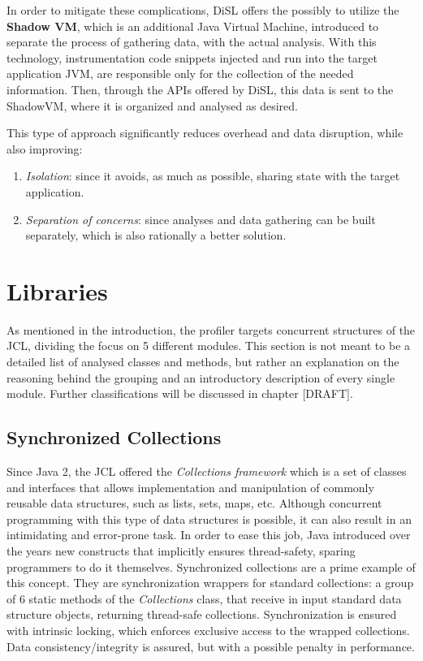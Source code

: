 \documentclass[]{usiinfthesis}
\begin{document}
In order to mitigate these complications, DiSL offers the possibly to utilize the \textbf{Shadow VM}, which is an additional Java Virtual Machine, introduced to separate the process of gathering data, with the actual analysis. With this technology, instrumentation code snippets injected and run into the target application JVM, are responsible only for the collection of the needed information. Then, through the APIs offered by DiSL, this data is sent to the ShadowVM, where it is organized and analysed as desired. 

This type of approach significantly reduces overhead and data disruption, while also improving:
\begin{enumerate}
    \item \textit{Isolation}: since it avoids, as much as possible, sharing state with the target application. 
    \item \textit{Separation of concerns}: since analyses and data gathering can be built separately, which is also rationally a better solution.
\end{enumerate}

\section{Libraries}
As mentioned in the introduction, the profiler targets concurrent structures of the JCL, dividing the focus on 5 different modules. This section is not meant to be a detailed list of analysed classes and methods, but rather an explanation on the reasoning behind the grouping and an introductory description of every single module. Further classifications will be discussed in chapter [DRAFT].

\subsection{Synchronized Collections}
Since Java 2, the JCL offered the \textit{Collections framework} which is a set of classes and interfaces that allows implementation and manipulation of commonly reusable data structures, such as lists, sets, maps, etc. Although concurrent programming with this type of data structures is possible, it can also result in an intimidating and error-prone task. In order to ease this job, Java introduced over the years new constructs that implicitly ensures thread-safety, sparing programmers to do it themselves. Synchronized collections are a prime example of this concept. They are synchronization wrappers for standard collections: a group of 6 static methods of the \textit{Collections} class, that receive in input standard data structure objects, returning thread-safe collections. Synchronization is ensured with intrinsic locking, which enforces exclusive access to the wrapped collections. Data consistency/integrity is assured, but with a possible penalty in performance.
\end{document}
